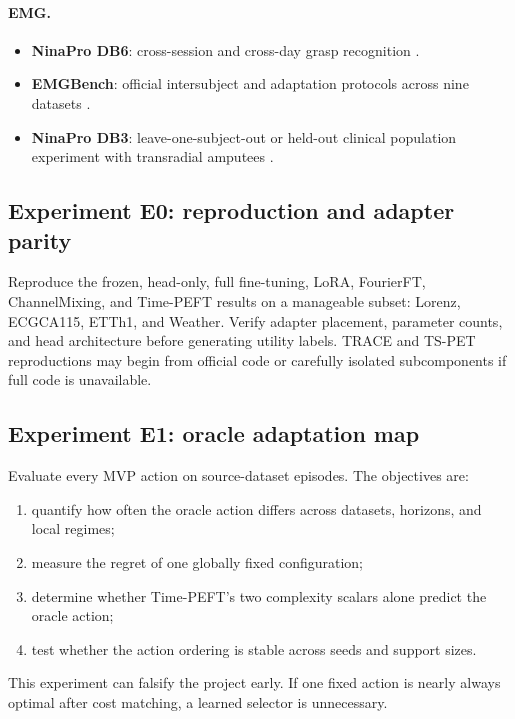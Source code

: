 \documentclass[10pt]{article}
\begin{document}
\paragraph{EMG.}
\begin{itemize}[leftmargin=*, itemsep=1pt]
    \item \textbf{NinaPro DB6}: cross-session and cross-day grasp recognition \citep{palermo2017db6}.
    \item \textbf{EMGBench}: official intersubject and adaptation protocols across nine datasets \citep{yang2024emgbench}.
    \item \textbf{NinaPro DB3}: leave-one-subject-out or held-out clinical population experiment with transradial amputees \citep{atzori2015ninapro}.
\end{itemize}

\subsection{Experiment E0: reproduction and adapter parity}

Reproduce the frozen, head-only, full fine-tuning, LoRA, FourierFT, ChannelMixing, and Time-PEFT results on a manageable subset: Lorenz, ECGCA115, ETTh1, and Weather. Verify adapter placement, parameter counts, and head architecture before generating utility labels. TRACE and TS-PET reproductions may begin from official code or carefully isolated subcomponents if full code is unavailable.

\subsection{Experiment E1: oracle adaptation map}

Evaluate every MVP action on source-dataset episodes. The objectives are:
\begin{enumerate}[leftmargin=*, itemsep=1pt]
    \item quantify how often the oracle action differs across datasets, horizons, and local regimes;
    \item measure the regret of one globally fixed configuration;
    \item determine whether Time-PEFT's two complexity scalars alone predict the oracle action;
    \item test whether the action ordering is stable across seeds and support sizes.
\end{enumerate}

This experiment can falsify the project early. If one fixed action is nearly always optimal after cost matching, a learned selector is unnecessary.
\end{document}
